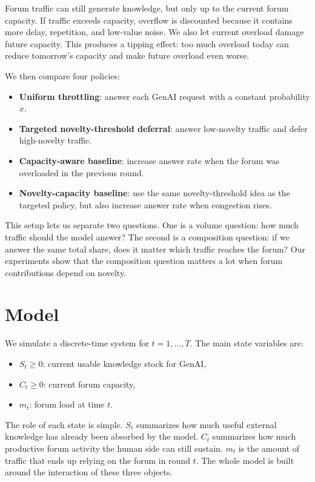 \documentclass{article}
\begin{document}
Forum traffic can still generate knowledge, but only up to the current forum capacity. If traffic exceeds capacity, overflow is discounted because it contains more delay, repetition, and low-value noise. We also let current overload damage future capacity. This produces a tipping effect: too much overload today can reduce tomorrow's capacity and make future overload even worse.

We then compare four policies:
\begin{itemize}[leftmargin=1.5em]
\item \textbf{Uniform throttling}: answer each GenAI request with a constant probability $x$.
\item \textbf{Targeted novelty-threshold deferral}: answer low-novelty traffic and defer high-novelty traffic.
\item \textbf{Capacity-aware baseline}: increase answer rate when the forum was overloaded in the previous round.
\item \textbf{Novelty-capacity baseline}: use the same novelty-threshold idea as the targeted policy, but also increase answer rate when congestion rises.
\end{itemize}

This setup lets us separate two questions. One is a volume question: how much traffic should the model answer? The second is a composition question: if we answer the same total share, does it matter which traffic reaches the forum? Our experiments show that the composition question matters a lot when forum contributions depend on novelty.

\section{Model}
We simulate a discrete-time system for $t=1,\dots,T$. The main state variables are:
\begin{itemize}[leftmargin=1.5em]
\item $S_t \ge 0$: current usable knowledge stock for GenAI,
\item $C_t \ge 0$: current forum capacity,
\item $m_t$: forum load at time $t$.
\end{itemize}

The role of each state is simple. $S_t$ summarizes how much useful external knowledge has already been absorbed by the model. $C_t$ summarizes how much productive forum activity the human side can still sustain. $m_t$ is the amount of traffic that ends up relying on the forum in round $t$. The whole model is built around the interaction of these three objects.
\end{document}
